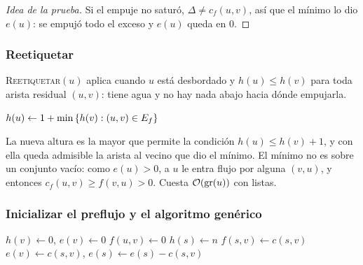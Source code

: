 \documentclass[11pt,letterpaper]{article}
\begin{document}
\begin{proof}[Idea de la prueba]
  Si el empuje no saturó, $\Delta \neq c_f(u, v)$, así que el mínimo
  lo dio $e(u)$: se empujó todo el exceso y $e(u)$ queda en $0$.
\end{proof}

\subsubsection*{Reetiquetar}

\textsc{Reetiquetar}$(u)$ aplica cuando $u$ está desbordado y
$h(u) \le h(v)$ para toda arista residual $(u, v)$: tiene agua y no
hay nada abajo hacia dónde empujarla.

\begin{algorithm}[H]
\caption{\textsc{Reetiquetar}$(u)$ \ (\textsc{Relabel} en Cormen)}
\label{alg:reetiquetar}
\begin{algorithmic}[1]
  \State $h(u) \gets 1 + \min\left\{ h(v) : (u, v) \in E_f \right\}$
\EndProcedure
\end{algorithmic}
\end{algorithm}

La nueva altura es la mayor que permite la condición
$h(u) \le h(v) + 1$, y con ella queda admisible la arista al vecino
que dio el mínimo. El mínimo no es sobre un conjunto vacío: como
$e(u) > 0$, a $u$ le entra flujo por alguna $(v, u)$, y entonces
$c_f(u, v) \ge f(v, u) > 0$. Cuesta $\mathcal{O}\!\left(\text{gr}(u)\right)$ con listas.

\subsubsection*{Inicializar el preflujo y el algoritmo genérico}

\begin{algorithm}[H]
\caption{\textsc{Inicializar-Preflujo}$(G, s)$}
\label{alg:inicializar-preflujo}
\begin{algorithmic}[1]
    \State $h(v) \gets 0$, \quad $e(v) \gets 0$
  \EndFor
    \State $f(u, v) \gets 0$
  \EndFor
  \State $h(s) \gets n$
    \State $f(s, v) \gets c(s, v)$ 
    \State $e(v) \gets c(s, v)$, \quad $e(s) \gets e(s) - c(s, v)$
  \EndFor
\EndProcedure
\end{algorithmic}
\end{algorithm}
\end{document}
